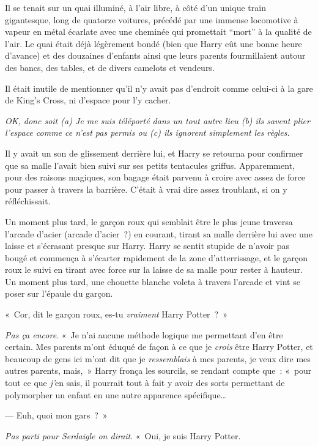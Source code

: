 Il se tenait sur un quai illuminé, à l'air libre, à côté d'un unique train gigantesque, long de quatorze voitures, précédé par une immense locomotive à vapeur en métal écarlate avec une cheminée qui promettait “mort” à la qualité de l'air. Le quai était déjà légèrement bondé (bien que Harry eût une bonne heure d'avance) et des douzaines d'enfants ainsi que leurs parents fourmillaient autour des bancs, des tables, et de divers camelots et vendeurs.

Il était inutile de mentionner qu'il n'y avait pas d'endroit comme celui-ci à la gare de King's Cross, ni d'espace pour l'y cacher.

\emph{OK, donc soit (a) Je me suis téléporté dans un tout autre lieu (b) ils savent plier l'espace comme ce n'est pas permis ou (c) ils ignorent simplement les règles.}

Il y avait un son de glissement derrière lui, et Harry se retourna pour confirmer que sa malle l'avait bien suivi sur ses petits tentacules griffus. Apparemment, pour des raisons magiques, son bagage était parvenu à croire avec assez de force pour passer à travers la barrière. C'était à vrai dire assez troublant, si on y réfléchissait.

Un moment plus tard, le garçon roux qui semblait être le plus jeune traversa l'arcade d'acier (arcade d'acier~?) en courant, tirant sa malle derrière lui avec une laisse et s'écrasant presque sur Harry. Harry se sentit stupide de n'avoir pas bougé et commença à s'écarter rapidement de la zone d'atterrissage, et le garçon roux le suivi en tirant avec force sur la laisse de sa malle pour rester à hauteur. Un moment plus tard, une chouette blanche voleta à travers l'arcade et vint se poser sur l'épaule du garçon.

«~Cor, dit le garçon roux, es-tu \emph{vraiment} Harry Potter~?~»

\emph{Pas ça encore}. «~Je n'ai aucune méthode logique me permettant d'en être certain. Mes parents m'ont éduqué de façon à ce que je \emph{crois} être Harry Potter, et beaucoup de gens ici m'ont dit que je \emph{ressemblais} à mes parents, je veux dire mes autres parents, mais,~» Harry fronça les sourcils, se rendant compte que~: «~pour tout ce que \emph{j'}en sais, il pourrait tout à fait y avoir des sorts permettant de polymorpher un enfant en une autre apparence spécifique…

--- Euh, quoi mon gars~?~»

\emph{Pas parti pour Serdaigle on dirait}. «~Oui, je suis Harry Potter.

